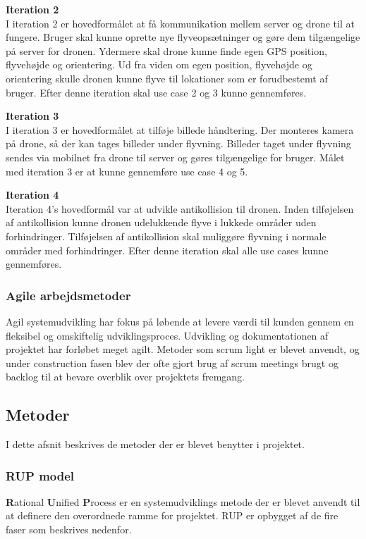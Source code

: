 \textbf{Iteration 2}\\
I iteration 2 er hovedformålet at få kommunikation mellem server og drone til at fungere. Bruger skal kunne oprette nye flyveopsætninger og gøre dem tilgængelige på server for dronen. Ydermere skal drone kunne finde egen GPS position, flyvehøjde og orientering. Ud fra viden om egen position, flyvehøjde og orientering skulle dronen kunne flyve til lokationer som er forudbestemt af bruger. Efter denne iteration skal use case 2 og 3 kunne gennemføres.

\textbf{Iteration 3}\\
I iteration 3 er hovedformålet at tilføje billede håndtering. Der monteres kamera på drone, så der kan tages billeder under flyvning. Billeder taget under flyvning sendes via mobilnet fra drone til server og gøres tilgængelige for bruger. Målet med iteration 3 er at kunne gennemføre use case 4 og 5.

\textbf{Iteration 4}\\
Iteration 4's hovedformål var at udvikle antikollision til dronen. Inden tilføjelsen af antikollision kunne dronen udelukkende flyve i lukkede områder uden forhindringer. Tilføjelsen af antikollision skal muliggøre flyvning i normale områder med forhindringer. Efter denne iteration skal alle use cases kunne gennemføres.


\subsubsection*{Agile arbejdsmetoder}
Agil systemudvikling har fokus på løbende at levere værdi til kunden gennem en fleksibel og omskiftelig udviklingsproces. Udvikling og dokumentationen af projektet har forløbet meget agilt. Metoder som scrum light er blevet anvendt, og under construction fasen blev der ofte gjort brug af scrum meetings brugt og backlog til at bevare overblik over projektets fremgang.


\newpage
\subsection{Metoder}
I dette afsnit beskrives de metoder der er blevet benytter i projektet.

\subsubsection*{RUP model}
\textbf{R}ational \textbf{U}nified \textbf{P}rocess er en systemudviklings metode der er blevet anvendt til at definere den overordnede ramme for projektet. RUP er opbygget af de fire faser som beskrives nedenfor.  


